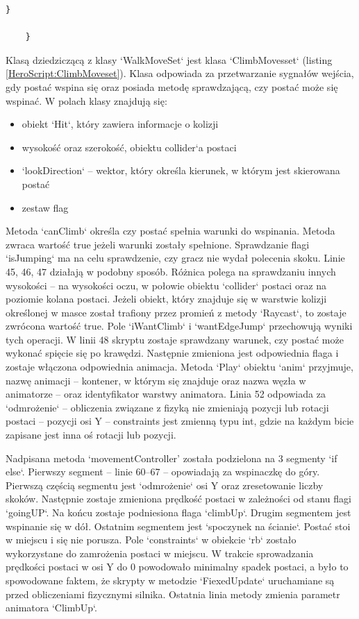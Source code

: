 \documentclass[12pt,twoside]{article}
\begin{document}
\begin{lstlisting}[language={[Sharp]C},caption=Skyrpt `WalkMoveSet' ,label={HeroScript:WalkMoveSet}]
        }
    
    }

\end{lstlisting}


Klasą dziedziczącą z klasy `WalkMoveSet` jest klasa `ClimbMovesset` (listing
\ref{HeroScript:ClimbMoveset}). Klasa odpowiada za przetwarzanie sygnałów
wejścia, gdy postać wspina się oraz posiada metodę sprawdzającą, czy postać może
się wspinać. W polach klasy znajdują się: 
\begin{itemize}
\item obiekt `Hit`, który zawiera informacje o kolizji
\item wysokość oraz szerokość, obiektu collider`a postaci
\item `lookDirection` -- wektor, który określa kierunek, w którym jest skierowana
postać
\item zestaw flag
\end{itemize}

Metoda `canClimb` określa czy postać spełnia warunki do wspinania. Metoda zwraca
wartość true jeżeli warunki zostały spełnione.  Sprawdzanie flagi `isJumping` ma
na celu sprawdzenie, czy gracz nie wydał polecenia skoku. Linie 45, 46, 47
działają w podobny sposób. Różnica polega na sprawdzaniu innych wysokości -- na
wysokości oczu, w połowie obiektu `collider` postaci oraz na poziomie kolana
postaci. Jeżeli obiekt, który znajduje się w warstwie kolizji określonej w masce
został trafiony przez promień z metody `Raycast`, to zostaje zwrócona wartość
true. Pole `iWantClimb` i `wantEdgeJump` przechowują wyniki tych operacji. W
linii 48 skryptu zostaje sprawdzany warunek, czy postać może wykonać spięcie się
po krawędzi. Następnie zmieniona jest odpowiednia flaga i zostaje włączona
odpowiednia animacja. Metoda `Play` obiektu `anim` przyjmuje, nazwę animacji –
kontener, w którym się znajduje oraz nazwa węzła w animatorze -- oraz
identyfikator warstwy animatora. Linia 52 odpowiada za `odmrożenie` -- obliczenia
związane z fizyką nie zmieniają pozycji lub rotacji postaci -- pozycji osi Y –
constraints jest zmienną typu int, gdzie na każdym bicie zapisane jest inna oś
rotacji lub pozycji.

Nadpisana metoda ‘movementController’ została podzielona na 3 segmenty `if
else`. Pierwszy segment -- linie 60--67 -- opowiadają za wspinaczkę do góry.
Pierwszą częścią segmentu jest `odmrożenie` osi Y oraz zresetowanie liczby
skoków. Następnie zostaje zmieniona prędkość postaci w zależności od stanu flagi
`goingUP`. Na końcu zostaje podniesiona flaga `climbUp`. Drugim segmentem jest
wspinanie się w dół. Ostatnim segmentem jest `spoczynek na ścianie`. Postać stoi
w miejscu i się nie porusza. Pole `constraints` w obiekcie `rb` zostało
wykorzystane do zamrożenia postaci w miejscu. W trakcie sprowadzania prędkości
postaci w osi Y do 0 powodowało minimalny spadek postaci, a było to spowodowane
faktem, że skrypty w metodzie `FiexedUpdate`  uruchamiane są przed obliczeniami
fizycznymi silnika. Ostatnia linia metody zmienia parametr animatora `ClimbUp`.
\end{document}
